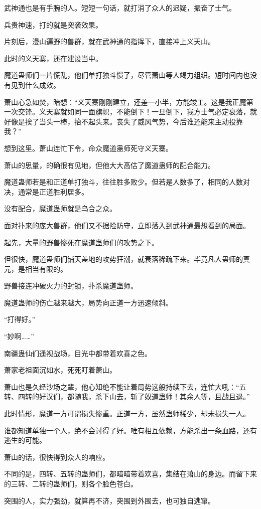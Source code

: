 \begin{this_body}
武神通也是有手腕的人。短短一句话，就打消了众人的迟疑，振奋了士气。

兵贵神速，打的就是突袭效果。

片刻后，漫山遍野的兽群，就在武神通的指挥下，直接冲上义天山。

此时的义天寨，还在建设当中。

魔道蛊师们一片慌乱，他们单打独斗惯了，尽管萧山等人竭力组织。短时间内也没有见到什么成效。

萧山心急如焚，暗想：“义天寨刚刚建立，还差一小半，方能竣工。这是我正魔第一次交锋。义天寨就如同一面旗帜，不能倒下！一旦倒下，我方士气必定衰落，就好像是挨了当头一棒，抬不起头来。丧失了威风气势，今后谁还能来主动投靠我？”

想到这里。萧山连忙下令，命众魔道蛊师死守义天寨。

萧山的思量，的确很有见地，但他大大高估了魔道蛊师的配合能力。

魔道蛊师若是和正道单打独斗，往往胜多败少。但若是人数多了，相同的人数对决，通常是正道胜利居多。

没有配合，魔道蛊师就是乌合之众。

面对扑来的庞大兽群，他们又不据险防守，立即落入到武神通最想看到的局面。

起先，大量的野兽惨死在魔道蛊师们的攻势之下。

但很快，魔道蛊师们铺天盖地的攻势狂潮，就衰落稀疏下来。毕竟凡人蛊师的真元，是相当有限的。

野兽接连冲破火力的封锁，扑杀魔道蛊师。

魔道蛊师的伤亡越来越大，局势向正道一方迅速倾斜。

“打得好。”

“妙啊……”

南疆蛊仙们遥视战场，目光中都带着欢喜之色。

萧家老祖面沉如水，死死盯着萧山。

萧山也是久经沙场之辈，他心知绝不能让着局势这般持续下去，连忙大吼：“五转、四转的好汉们，都随我，杀下山去，斩了奴道蛊师！其余人等，且战且退。”

此时情形，魔道一方可谓损失惨重。正道一方，虽然蛊师稀少，却未损失一人。

谁都知道单独一个人，绝不会讨得了好。唯有相互依赖，方能杀出一条血路，还有逃生的可能。

萧山的话，很快得到众人的响应。

不同的是，四转、五转的蛊师们，都暗暗带着欢喜，集结在萧山的身边。而留下来的三转、二转的蛊师们，则各个脸色苍白。

突围的人，实力强劲，就算再不济，突围到外围去，也可独自逃窜。


\end{this_body}
